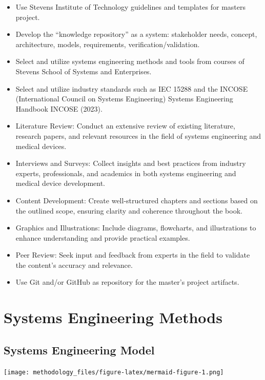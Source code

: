 \documentclass[
  letterpaper,
  DIV=11,
  numbers=noendperiod]{scrreprt}
\begin{document}
\begin{itemize}
\item
  Use Stevens Institute of Technology guidelines and templates for
  masters project.
\item
  Develop the ``knowledge repository'' as a system: stakeholder needs,
  concept, architecture, models, requirements, verification/validation.
\item
  Select and utilize systems engineering methods and tools from courses
  of Stevens School of Systems and Enterprises.
\item
  Select and utilize industry standards such as IEC 15288 and the INCOSE
  (International Council on Systems Engineering) Systems Engineering
  Handbook INCOSE (2023).
\item
  Literature Review: Conduct an extensive review of existing literature,
  research papers, and relevant resources in the field of systems
  engineering and medical devices.
\item
  Interviews and Surveys: Collect insights and best practices from
  industry experts, professionals, and academics in both systems
  engineering and medical device development.
\item
  Content Development: Create well-structured chapters and sections
  based on the outlined scope, ensuring clarity and coherence throughout
  the book.
\item
  Graphics and Illustrations: Include diagrams, flowcharts, and
  illustrations to enhance understanding and provide practical examples.
\item
  Peer Review: Seek input and feedback from experts in the field to
  validate the content's accuracy and relevance.
\item
  Use Git and/or GitHub as repository for the master's project
  artifacts.
\end{itemize}

\section{Systems Engineering Methods}\label{systems-engineering-methods}

\subsection{Systems Engineering Model}\label{systems-engineering-model}

\texttt{[image: methodology\_files/figure-latex/mermaid-figure-1.png]}
\end{document}
